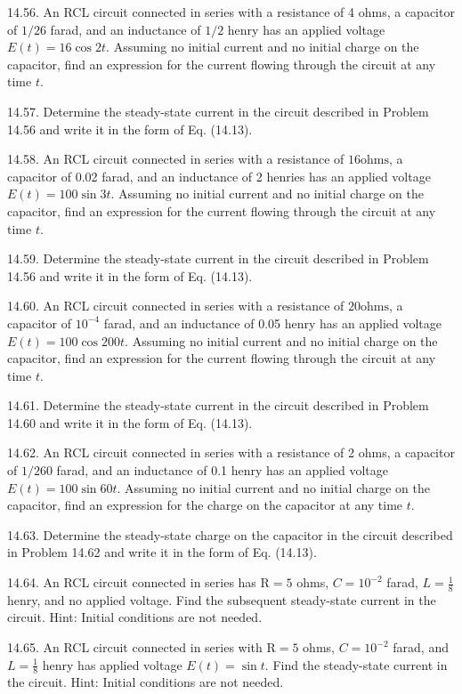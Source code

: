 \documentclass[10pt]{article}
\begin{document}
14.56. An RCL circuit connected in series with a resistance of 4 ohms, a capacitor of $1 / 26$ farad, and an inductance of $1 / 2$ henry has an applied voltage $E(t)=16 \cos 2 t$. Assuming no initial current and no initial charge on the capacitor, find an expression for the current flowing through the circuit at any time $t$.

14.57. Determine the steady-state current in the circuit described in Problem 14.56 and write it in the form of Eq. (14.13).

14.58. An RCL circuit connected in series with a resistance of $16 \mathrm{ohms}$, a capacitor of 0.02 farad, and an inductance of 2 henries has an applied voltage $E(t)=100 \sin 3 t$. Assuming no initial current and no initial charge on the capacitor, find an expression for the current flowing through the circuit at any time $t$.

14.59. Determine the steady-state current in the circuit described in Problem 14.56 and write it in the form of Eq. (14.13).

14.60. An RCL circuit connected in series with a resistance of $20 \mathrm{ohms}$, a capacitor of $10^{-4}$ farad, and an inductance of 0.05 henry has an applied voltage $E(t)=100 \cos 200 t$. Assuming no initial current and no initial charge on the capacitor, find an expression for the current flowing through the circuit at any time $t$.

14.61. Determine the steady-state current in the circuit described in Problem 14.60 and write it in the form of Eq. (14.13).

14.62. An RCL circuit connected in series with a resistance of 2 ohms, a capacitor of $1 / 260$ farad, and an inductance of 0.1 henry has an applied voltage $E(t)=100 \sin 60 t$. Assuming no initial current and no initial charge on the capacitor, find an expression for the charge on the capacitor at any time $t$.

14.63. Determine the steady-state charge on the capacitor in the circuit described in Problem 14.62 and write it in the form of Eq. (14.13).

14.64. An RCL circuit connected in series has $\mathrm{R}=5$ ohms, $C=10^{-2}$ farad, $L=\frac{1}{8}$ henry, and no applied voltage. Find the subsequent steady-state current in the circuit. Hint: Initial conditions are not needed.

14.65. An RCL circuit connected in series with $\mathrm{R}=5$ ohms, $C=10^{-2}$ farad, and $L=\frac{1}{8}$ henry has applied voltage $E(t)=\sin t$. Find the steady-state current in the circuit. Hint: Initial conditions are not needed.
\end{document}
